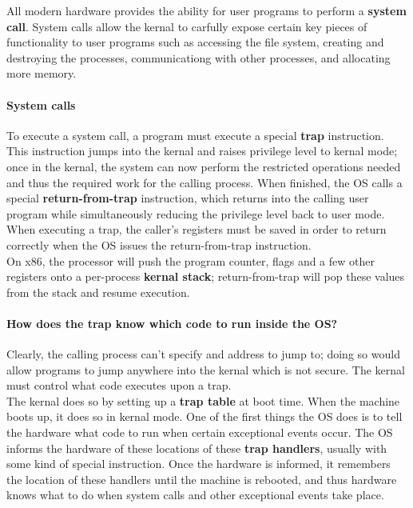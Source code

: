 All modern hardware provides the ability for user programs to perform a 
\textbf{system call}. System calls allow the kernal to carfully expose
certain key pieces of functionality to user programs such as accessing the file
system, creating and destroying the processes, communicationg with other
processes, and allocating more memory.

\paragraph{System calls}

To execute a system call, a program must execute a special \textbf{trap}
instruction. This instruction jumps into the kernal and raises privilege level
to kernal mode; once in the kernal, the system can now perform the restricted 
operations needed and thus the required work for the calling process. When 
finished, the OS calls a special \textbf{return-from-trap} instruction, which
returns into the calling user program while simultaneously reducing the 
privilege level back to user mode.\\

When executing a trap, the caller's registers must be saved in order to 
return correctly when the OS issues the return-from-trap instruction.\\

On x86, the processor will push the program counter, flags and a few other
registers onto a per-process \textbf{kernal stack}; return-from-trap
will pop these values from the stack and resume execution.

\paragraph{How does the trap know which code to run inside the OS?}

Clearly, the calling process can't specify and address to jump to; doing so 
would allow programs to jump anywhere into the kernal which is not secure. The
kernal must control what code executes upon a trap.\\

The kernal does so by setting up a \textbf{trap table} at boot time. When the
machine boots up, it does so in kernal mode. One of the first things the OS
does is to tell the hardware what code to run when certain exceptional events
occur. The OS informs the hardware of these locations of these
\textbf{trap handlers}, usually with some kind of special instruction. Once
the hardware is informed, it remembers the location of these handlers until
the machine is rebooted, and thus hardware knows what to do when system calls
and other exceptional events take place.\\

